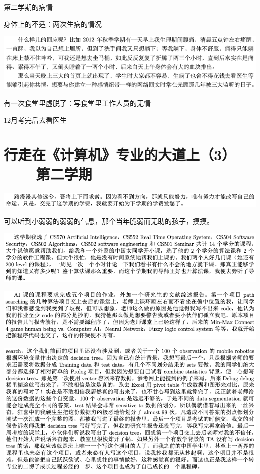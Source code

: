 \documentclass[9pt, b5paper]{article}
\begin{document}
第二学期的病情

身体上的不适：两次生病的情况

\begin{center}
\includegraphics[width=.9\linewidth]{./pic/backups_plans_20210424_095434.png}
\end{center}

有一次食堂里虚脱了：写食堂里工作人员的无情

12月考完后去看医生

\section{行走在《计算机》专业的大道上（3）——第二学期}
\label{sec:org9ca62ad}

\begin{center}
\includegraphics[width=.9\linewidth]{./pic/backups_plans_20210424_213617.png}
\end{center}

可以听到小弱弱的弱弱的气息，那个当年脆弱而无助的孩子，摸摸。


\begin{center}
\includegraphics[width=.9\linewidth]{./pic/backups_plans_20210424_213746.png}
\end{center}


\begin{center}
\includegraphics[width=.9\linewidth]{./pic/backups_plans_20210424_213816.png}
\end{center}


\begin{center}
\includegraphics[width=.9\linewidth]{./pic/backups_plans_20210424_215400.png}
\end{center}
\end{document}
